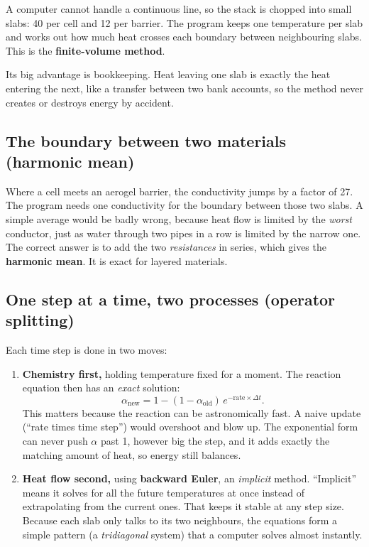 \documentclass[11pt]{article}
\begin{document}
A computer cannot handle a continuous line, so the stack is chopped into small slabs:
40 per cell and 12 per barrier. The program keeps one temperature per slab and works out
how much heat crosses each boundary between neighbouring slabs. This is the
\textbf{finite-volume method}.

Its big advantage is bookkeeping. Heat leaving one slab is exactly the heat entering the
next, like a transfer between two bank accounts, so the method never creates or destroys
energy by accident.

\subsection*{The boundary between two materials (harmonic mean)}

Where a cell meets an aerogel barrier, the conductivity jumps by a factor of 27. The
program needs one conductivity for the boundary between those two slabs. A simple
average would be badly wrong, because heat flow is limited by the \emph{worst}
conductor, just as water through two pipes in a row is limited by the narrow one. The
correct answer is to add the two \emph{resistances} in series, which gives the
\textbf{harmonic mean}. It is exact for layered materials.

\subsection*{One step at a time, two processes (operator splitting)}

Each time step is done in two moves:

\begin{enumerate}
  \item \textbf{Chemistry first,} holding temperature fixed for a moment. The reaction
        equation then has an \emph{exact} solution:
        \[
          \alpha_\text{new} = 1 - (1-\alpha_\text{old})\,e^{-\text{rate}\times\Delta t}.
        \]
        This matters because the reaction can be astronomically fast. A naive update
        (``rate times time step'') would overshoot and blow up. The exponential form can
        never push $\alpha$ past 1, however big the step, and it adds exactly the
        matching amount of heat, so energy still balances.
  \item \textbf{Heat flow second,} using \textbf{backward Euler}, an \emph{implicit}
        method. ``Implicit'' means it solves for all the future temperatures at once
        instead of extrapolating from the current ones. That keeps it stable at any step
        size. Because each slab only talks to its two neighbours, the equations form a
        simple pattern (a \emph{tridiagonal} system) that a computer solves almost
        instantly.
\end{enumerate}
\end{document}
